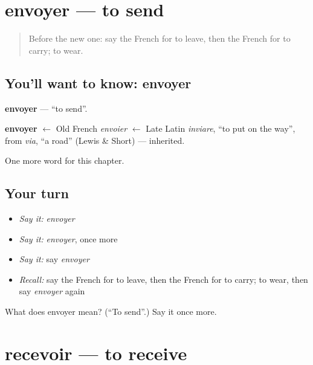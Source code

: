 \section[envoyer]{envoyer — to send}

\label{lesson:FR-C65-envoyer}



\begin{quote}
Before the new one: say the French for to leave, then the French for to carry; to wear.
\end{quote}

\subsection*{You'll want to know: envoyer}
\textbf{envoyer} — \textquotedblleft{}to send\textquotedblright{}.

\begin{cousinweb}
\textbf{envoyer} $\leftarrow$ Old French \emph{envoier} $\leftarrow$ Late Latin \emph{inviare}, \textquotedblleft{}to put on the way\textquotedblright{}, from \emph{via}, \textquotedblleft{}a road\textquotedblright{} (Lewis \& Short) — inherited.
\end{cousinweb}

\begin{grammarlens}[title={What you've built}]
One more word for this chapter.
\end{grammarlens}

\subsection*{Your turn}
\begin{itemize}
\raggedright
  \item \emph{Say it:} \emph{envoyer}
  \item \emph{Say it:} \emph{envoyer}, once more
  \item \emph{Say it:} say \emph{envoyer}
  \item \emph{Recall:} say the French for to leave, then the French for to carry; to wear, then say \emph{envoyer} again
\end{itemize}

\begin{tcolorbox}[breakable,colback=teal!4,colframe=teal!35!black,title={Before you move on}]
What does envoyer mean? (\textquotedblleft{}To send\textquotedblright{}.) Say it once more.
\end{tcolorbox}
\section[recevoir]{recevoir — to receive}

